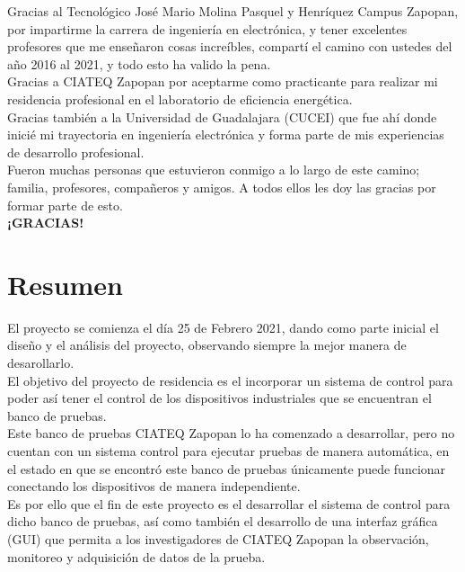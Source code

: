 \documentclass[12pt,titlepage]{article}
\begin{document}
Gracias al Tecnológico José Mario Molina Pasquel y Henríquez Campus Zapopan, por impartirme la carrera de ingeniería en electrónica, y tener excelentes profesores que me enseñaron cosas increíbles, compartí el camino con ustedes del año 2016 al 2021, y todo esto ha valido la pena. \\

Gracias a CIATEQ Zapopan por aceptarme como practicante para realizar mi residencia profesional en el laboratorio de eficiencia energética. \\ 

Gracias también a la Universidad de Guadalajara (CUCEI) que fue ahí donde inicié mi trayectoria en ingeniería electrónica y forma parte de mis experiencias de desarrollo profesional. \\

Fueron muchas personas que estuvieron conmigo a lo largo de este camino; familia, profesores, compañeros y amigos. A todos ellos les doy las gracias por formar parte de esto. \\

\textbf{¡GRACIAS!}
 
\newpage
\section*{Resumen}
El proyecto se comienza el día 25 de Febrero 2021, dando como parte inicial el diseño y el análisis del proyecto, observando siempre la mejor manera de desarollarlo.\\

El objetivo del proyecto de residencia es el incorporar un sistema de control para poder así tener el control de los dispositivos industriales que se encuentran el banco de pruebas. \\

Este banco de pruebas CIATEQ Zapopan lo ha comenzado a desarrollar, pero no cuentan con un sistema control para ejecutar pruebas de manera automática, en el estado en que se encontró este banco de pruebas únicamente puede funcionar conectando los dispositivos de manera independiente. \\

Es por ello que el fin de este proyecto es el desarrollar el sistema de control para dicho banco de pruebas, así como también el desarrollo de una interfaz gráfica (GUI) que permita a los investigadores de CIATEQ Zapopan la observación, monitoreo y adquisición de datos de la prueba. \\
\end{document}

